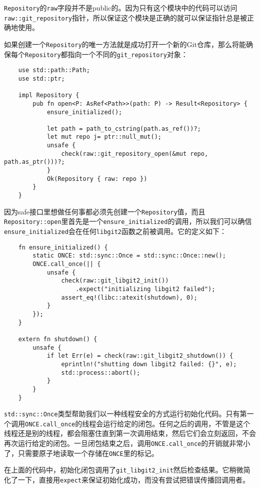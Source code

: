 \texttt{Repository}的\texttt{raw}字段并不是public的。因为只有这个模块中的代码可以访问\\
\texttt{raw::git\_repository}指针，所以保证这个模块是正确的就可以保证指针总是被正确地使用。

如果创建一个\texttt{Repository}的唯一方法就是成功打开一个新的Git仓库，那么将能确保每个\texttt{Repository}都指向一个不同的\texttt{git\_repository}对象：
\begin{verbatim}
    use std::path::Path;
    use std::ptr;

    impl Repository {
        pub fn open<P: AsRef<Path>>(path: P) -> Result<Repository> {
            ensure_initialized();

            let path = path_to_cstring(path.as_ref())?;
            let mut repo j= ptr::null_mut();
            unsafe {
                check(raw::git_repository_open(&mut repo, path.as_ptr()))?;
            }
            Ok(Repository { raw: repo })
        }
    }
\end{verbatim}

因为safe接口里想做任何事都必须先创建一个\texttt{Repository}值，而且\texttt{Repository::open}里首先是一个\texttt{ensure\_initialized}的调用，所以我们可以确信\texttt{ensure\_initialized}会在任何\texttt{libgit2}函数之前被调用。它的定义如下：
\begin{verbatim}
    fn ensure_initialized() {
        static ONCE: std::sync::Once = std::sync::Once::new();
        ONCE.call_once(|| {
            unsafe {
                check(raw::git_libgit2_init())
                    .expect("initializing libgit2 failed");
                assert_eq!(libc::atexit(shutdown), 0);
            }
        });
    }

    extern fn shutdown() {
        unsafe {
            if let Err(e) = check(raw::git_libgit2_shutdown()) {
                eprintln!("shutting down libgit2 failed: {}", e);
                std::process::abort();
            }
        }
    }
\end{verbatim}

\texttt{std::sync::Once}类型帮助我们以一种线程安全的方式运行初始化代码。只有第一个调用\texttt{ONCE.call\_once}的线程会运行给定的闭包。任何之后的调用，不管是这个线程还是别的线程，都会阻塞住直到第一次调用结束，然后它们会立刻返回，不会再次运行给定的闭包。一旦闭包结束之后，调用\texttt{ONCE.call\_once}的开销就非常小了，只需要原子地读取一个存储在\texttt{ONCE}里的标记。

在上面的代码中，初始化闭包调用了\texttt{git\_libgit2\_init}然后检查结果。它稍微简化了一下，直接用\texttt{expect}来保证初始化成功，而没有尝试把错误传播回调用者。

